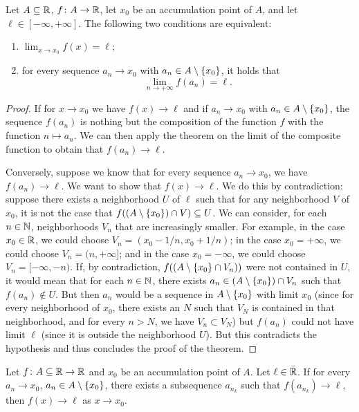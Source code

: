 \begin{theorem}%
\label{th:ponte}%
\mymark{***}%
Let $A \subseteq {\mathbb R}$, $f\colon A \to {\mathbb R}$, let $x_0$ be an accumulation point of
$A$, and let
$\ell \in [-\infty, +\infty]$.
The following two conditions are equivalent:
\begin{enumerate}
\item $\displaystyle \lim_{x\to x_0} f(x) = \ell$;
\item for every sequence $a_n\to x_0$ with $a_n\in A\setminus{\left\{ x_0 \right\}}$, it holds that
\[
\lim_{n\to+\infty} f(a_n) = \ell. 
\]
\end{enumerate}
\end{theorem}
%
\begin{proof}
\mymark{***}
If for $x\to x_0$ we have $f(x)\to \ell$ and if $a_n \to x_0$ with $a_n\in
A\setminus{\left\{ x_0 \right\}}$, the sequence $f(a_n)$ is nothing but the composition
of the function $f$ with the function $n\mapsto a_n$. We can then apply
the theorem on the limit of the composite function to obtain that $f(a_n)\to
\ell$.

Conversely, suppose we know that for every sequence $a_n\to x_0$, we have
$f(a_n)\to \ell$. We want to show that $f(x)\to \ell$. We do this by
contradiction: suppose there exists a neighborhood $U$ of $\ell$ such that for
any neighborhood $V$ of $x_0$, it is not the case that
$f((A\setminus{\left\{ x_0 \right\}})\cap V)\subseteq U$.
We can consider, for each $n\in {\mathbb N}$, neighborhoods $V_n$ that are increasingly
smaller. For example, in the case $x_0 \in {\mathbb R}$, we could choose $V_n =
(x_0-1/n, x_0+1/n)$; in the case $x_0 = +\infty$, we could choose $V_n =
(n,+\infty]$; and in the case $x_0=-\infty$, we could choose $V_n = [-\infty,
-n)$.
If, by contradiction, $f((A\setminus{\left\{ x_0 \right\}}\cap V_n))$ were not contained
in $U$,
it would mean that for each $n\in{\mathbb N}$, there exists $a_n \in
(A\setminus{\left\{ x_0 \right\}})\cap V_n$ such that $f(a_n)\not \in U$. But then $a_n$
would be a sequence in
$A\setminus {\left\{ x_0 \right\}}$ with limit $x_0$
(since for every neighborhood of $x_0$, there exists an $N$ such that $V_N$ is
contained in that neighborhood, and for every $n>N$, we have $V_n\subset V_N$)
but $f(a_n)$ could not have limit $\ell$
(since it is outside the neighborhood $U$).
But this contradicts the hypothesis and thus concludes the proof of the theorem.
\end{proof}
\begin{proposition}
  \label{prop:convergenza}
Let $f\colon A\subseteq {\mathbb R}\to {\mathbb R}$ and $x_0$ be an accumulation point of $A$.
Let $\ell\in \bar {{\mathbb R}}$.
If for every $a_n\to x_0$, $a_n\in A\setminus{\left\{ x_0 \right\}}$,
there exists a subsequence $a_{n_k}$ such that $f(a_{n_k})\to \ell$, 
then $f(x)\to \ell$ as $x\to x_0$.
\end{proposition}
